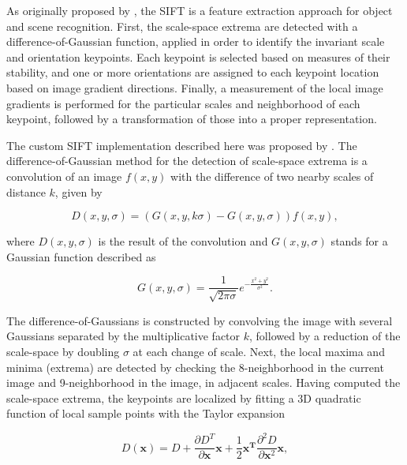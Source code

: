 As originally proposed by , the SIFT is a feature extraction approach for object and scene recognition. First, the scale-space extrema are detected with a difference-of-Gaussian function, applied in order to identify the invariant scale and orientation keypoints. Each keypoint is selected based on measures of their stability, and one or more orientations are assigned to each keypoint location based on image gradient directions. Finally, a measurement of the local image gradients is performed for the particular scales and neighborhood of each keypoint, followed by a transformation of those into a proper representation.

The custom SIFT implementation described here was proposed by . The difference-of-Gaussian method for the detection of scale-space extrema is a convolution of an image $f(x,y)$ with the difference of two nearby scales of distance $k$, given by

\begin{equation}
\label{eqn:DoG}
D(x,y,\sigma) = \left(G(x,y,k \sigma) - G(x,y,\sigma)\right) f(x,y),
\end{equation}

\noindent where $D(x,y,\sigma)$ is the result of the convolution and $G(x,y,\sigma)$ stands for a Gaussian function described as

\begin{equation}
\label{eqn:gaussian_function}
G(x,y,\sigma) = \frac{1}{\sqrt{2 \pi \sigma}} e^{- \frac{x^{2} + y^{2}}{\sigma^{2}}}.
\end{equation}

The difference-of-Gaussians is constructed by convolving the image with several Gaussians separated by the multiplicative factor $k$, followed by a reduction of the scale-space by doubling $\sigma$ at each change of scale. Next, the local maxima and minima (extrema) are detected by checking the 8-neighborhood in the current image and 9-neighborhood in the image, in adjacent scales. Having computed the scale-space extrema, the keypoints are localized by fitting a 3D quadratic function of local sample points with the Taylor expansion

\begin{equation}
\label{eqn:taylor_DoG}
D(\mathbf{x}) = D + 
                \frac{\partial D^{T}}{\partial  \mathbf{x}}\mathbf{x} + \frac{1}{2}\mathbf{x^{T}}\frac{\partial^{2} D}{\partial \mathbf{x}^{2}}\mathbf{x},
\end{equation}

